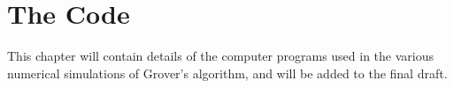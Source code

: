 
\chapter{The Code}
\label{chap:code}


This chapter will contain details of the computer programs used
in the various numerical simulations of Grover's algorithm, and
will be added to the final draft.

